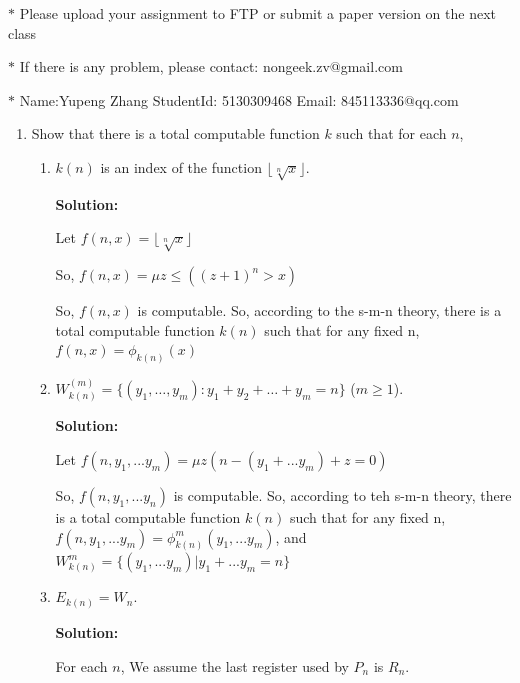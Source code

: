 \documentclass[12pt,a4paper]{article}
\theoremstyle{definition}
\numberwithin{equation}{section}
\numberwithin{figure}{section}
\begin{document}
\noindent{}
\begin{center}
\footnotesize{\color{red}$*$ Please upload your assignment to FTP or submit a paper version on the next class}

\footnotesize{\color{red}$*$ If there is any problem, please contact: nongeek.zv@gmail.com }

\footnotesize{\color{blue}$*$ Name:Yupeng Zhang \quad StudentId: 5130309468 \quad Email: 845113336@qq.com}
\end{center}


\begin{enumerate}%
  \item Show that there is a total computable function $k$ such that for each $n$,
    \begin{enumerate}
      \item $k(n)$ is an index of the function $\lfloor\sqrt[n]{x}\rfloor$.
      
      \textbf{Solution:}
      
      Let $f(n,x) = \lfloor\sqrt[n]{x}\rfloor$
      
      So, $f(n,x) = \mu z \leq ((z+1)^n>x)$
      
      So, $f(n,x)$ is computable. So, according to the s-m-n theory, there is a total computable function $k(n)$ such that for any fixed n, $f(n,x) = \phi_{k(n)}(x)$ 
      
      
      \item $W_{k(n)}^{(m)}=\{(y_{1},\ldots,y_{m}):y_{1}+y_{2}+\ldots+y_{m}=n\}$ ($m\geq 1$).
      
      \textbf{Solution:}
      
      Let $f(n,y_1,...y_m) = \mu z(n-(y_1+...y_m)+z=0)$
      
      So, $f(n,y_1,...y_n)$ is computable. So, according to teh s-m-n theory, there is a total computable function $k(n)$ such that for any fixed n, $f(n,y_1,...y_m) = \phi_{k(n)}^{m}(y_1,...y_m)$, and $W_{k(n)}^{m} = \{(y_1,...y_m) | y_1+...y_m = n\}$ 
      
      
      \item $E_{k(n)}=W_n$.
      
      \textbf{Solution:}
      
      For each $n$, We assume the last register used by $P_n$ is $R_n$.
      

\end{enumerate}
\end{enumerate}
\end{document}
